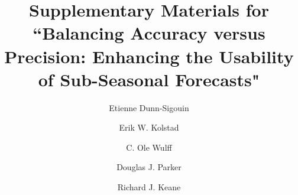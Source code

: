 \documentclass[preprint,12pt,authoryear]{elsarticle}
\begin{document}
\begin{frontmatter}



\title{Supplementary Materials for ``Balancing Accuracy versus Precision: Enhancing the Usability of Sub-Seasonal Forecasts"} %



\author[label1,label2]{Etienne Dunn-Sigouin} %


\author[label1,label2]{Erik W. Kolstad}


\author[label1,label2]{C. Ole Wulff}

\author[label1,label2,label3,label4]{Douglas J. Parker}

\author[label3,label5]{Richard J. Keane}





\end{frontmatter}
\end{document}
